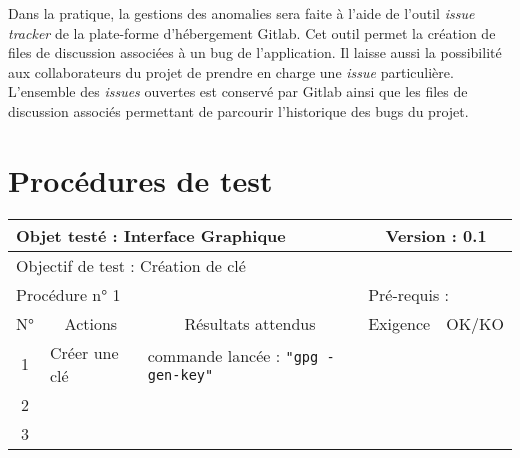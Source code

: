\documentclass{../res/univ-projet}
\begin{document}
  Dans la pratique, la gestions des anomalies sera faite à l'aide de l'outil \emph{issue tracker} de
  la plate-forme d'hébergement Gitlab. Cet outil permet la création de files de discussion associées à un bug
  de l'application. Il laisse aussi la possibilité aux collaborateurs du projet de prendre en charge 
  une \emph{issue} particulière. L'ensemble des \emph{issues} ouvertes est conservé par Gitlab ainsi
  que les files de discussion associés permettant de parcourir l'historique des bugs du projet.


\section{Procédures de test}

\begin{center}
    \begin{tabular}{|c|p{5cm}|p{5cm}|p{1.5cm}|p{1.5cm}|}
      \hline
      \multicolumn{3}{|l|}{Objet testé : Interface Graphique} & \multicolumn{2}{c|}{Version : 0.1}\\ \hline
      \multicolumn{5}{|l|}{Objectif de test : Création de clé}\\ \hline
      \multicolumn{3}{|l|}{Procédure n° 1} & \multicolumn{2}{p{3cm}|}{Pré-requis : }\\ \hline
      \multicolumn{1}{|c|}{N°} & \multicolumn{1}{c|}{Actions} & \multicolumn{1}{c|}{Résultats attendus} & 
      \multicolumn{1}{c|}{Exigence} & \multicolumn{1}{c|}{OK/KO}\\ \hline
      1 & Créer une clé & commande lancée : \texttt{"gpg -\-gen-key"} &  & \\
      2 &  &  &  & \\
      3 &  &  &  & \\ \hline
    \end{tabular}
    \vskip 2.2cm




\end{center}
\end{document}
